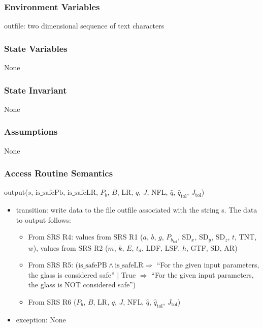 \documentclass[12pt, titlepage]{article}
\begin{document}
\subsubsection {Environment Variables}

outfile: two dimensional sequence of text characters

\subsubsection {State Variables}

None

\subsubsection {State Invariant}

None

\subsubsection {Assumptions}

None

\subsubsection {Access Routine Semantics}

\noindent output($s$, $\mbox{is\_safePb}$, $\mbox{is\_safeLR}$, $P_b$, $B$, 
LR, $q$, $J$, NFL, $\hat{q}$, $\hat{q}_{\text{tol}}$, $J_{\text{tol}}$)

\begin{itemize}
\item transition: write data to the file outfile associated with the string s.
  The data to output follows:
\begin{itemize}
\item From SRS R4: values from SRS R1 ($a$, $b$, $g$, $P_{b_\text{tol}}$, $\mbox{SD}_x$,
  $\mbox{SD}_y$, $\mbox{SD}_z$, $t$, TNT, $w$), values from SRS R2 ($m$, $k$, $E$,
  $t_d$, LDF, LSF, $h$, GTF, SD, AR)
\item From SRS R5: ($\mbox{is\_safePB} \wedge \mbox{is\_safeLR}
  \Rightarrow$ ``For the given input parameters, the glass is considered safe''
 $ |$ True $\Rightarrow$ ``For the given input parameters, the glass is NOT
 considered safe'') 
\item From SRS R6 ($P_b$, $B$, LR, $q$, $J$, NFL, $\hat{q}$, $\hat{q}_{\text{tol}}$, $J_{\text{tol}}$)
\end{itemize}
\item exception: None
\end{itemize}
\end{document}
